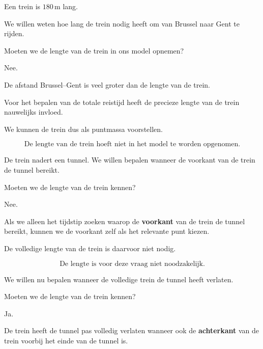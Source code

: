 \documentclass{ximera}
\begin{document}
  \begin{oefening}{\oefB\ESS}
  
  Een trein is $180\,\si{\meter}$ lang.
  
  \begin{question}
  We willen weten hoe lang de trein nodig heeft om van Brussel naar Gent te
  rijden.
  
  Moeten we de lengte van de trein in ons model opnemen?
  
  \begin{oplossing}
  Nee.
  
  De afstand Brussel--Gent is veel groter dan de lengte van de trein.
  
  Voor het bepalen van de totale reistijd heeft de precieze lengte van de trein
  nauwelijks invloed.
  
  We kunnen de trein dus als puntmassa voorstellen.
  
  \[
  \boxed{\text{De lengte van de trein hoeft niet in het model te worden opgenomen.}}
  \]
  \end{oplossing}
  \end{question}
  
  
  \begin{question}
  De trein nadert een tunnel. We willen bepalen wanneer de voorkant van de trein
  de tunnel bereikt.
  
  Moeten we de lengte van de trein kennen?
  
  \begin{oplossing}
  Nee.
  
  Als we alleen het tijdstip zoeken waarop de \textbf{voorkant} van de trein de
  tunnel bereikt, kunnen we de voorkant zelf als het relevante punt kiezen.
  
  De volledige lengte van de trein is daarvoor niet nodig.
  
  \[
  \boxed{\text{De lengte is voor deze vraag niet noodzakelijk.}}
  \]
  \end{oplossing}
  \end{question}
  
  
  \begin{question}
  We willen nu bepalen wanneer de volledige trein de tunnel heeft verlaten.
  
  Moeten we de lengte van de trein kennen?
  
  \begin{oplossing}
  Ja.
  
  De trein heeft de tunnel pas volledig verlaten wanneer ook de
  \textbf{achterkant} van de trein voorbij het einde van de tunnel is.
  

\end{oplossing}
\end{question}
\end{oefening}
\end{document}
